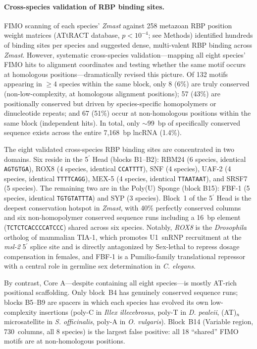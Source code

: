 \documentclass[12pt]{article}
\newcommand{\illex}{\textit{Illex illecebrosus}\xspace}
\begin{document}
\paragraph{Cross-species validation of RBP binding sites.}
FIMO scanning of each species' \textit{Zmast} against 258 metazoan RBP
position weight matrices (ATtRACT database, $p < 10^{-4}$; see Methods)
identified hundreds of binding sites per species
and suggested dense, multi-valent RBP binding across \textit{Zmast}.
However, systematic cross-species validation---mapping
all eight species' FIMO hits to alignment coordinates
and testing whether the same motif occurs at homologous positions---dramatically
revised this picture.
Of 132 motifs appearing in $\geq$4 species within the same block,
only 8 (6\%) are truly conserved
(non-low-complexity, at homologous alignment positions);
57 (43\%) are positionally conserved but driven
by species-specific homopolymers or dinucleotide repeats;
and 67 (51\%) occur at non-homologous positions
within the same block (independent hits).
In total, only $\sim$99~bp of specifically conserved sequence exists
across the entire 7,168~bp lncRNA (1.4\%).

The eight validated cross-species RBP binding sites
are concentrated in two domains.
Six reside in the 5$^\prime$ Head (blocks B1--B2):
RBM24 (6 species, identical \texttt{AGTGTGA}),
ROX8 (4 species, identical \texttt{CCATTTT}),
SNF (4 species), UAF-2 (4 species, identical \texttt{TTTTCAGG}),
MEX-5 (4 species, identical \texttt{TTAATAAT}),
and SRSF7 (5 species).
The remaining two are in the Poly(U) Sponge (block B15):
FBF-1 (5 species, identical \texttt{TGTGTATTTA})
and SYP (3 species).
Block~1 of the 5$^\prime$ Head is the deepest conservation hotspot in \textit{Zmast},
with 40\% perfectly conserved columns
and six non-homopolymer conserved sequence runs
including a 16~bp element (\texttt{TCTCTCACCCCATCCC})
shared across six species.
Notably, \textit{ROX8} is the \textit{Drosophila} ortholog of mammalian TIA-1,
which promotes U1~snRNP recruitment at the \textit{msl-2} 5$^\prime$ splice site
and is directly antagonized by Sex-lethal to repress dosage compensation in females,
and FBF-1 is a Pumilio-family translational repressor
with a central role in germline sex determination
in \textit{C. elegans}.

By contrast, Core A---despite containing all eight species---is
mostly AT-rich positional scaffolding.
Only block~B4 has genuinely conserved sequence runs;
blocks B5--B9 are spacers in which each species has evolved
its own low-complexity insertions
(poly-C in \illex, poly-T in \textit{D. pealeii},
(AT)$_n$ microsatellite in \textit{S. officinalis}, poly-A in \textit{O. vulgaris}).
Block~B14 (Variable region, 730~columns, all 8 species)
is the largest false positive:
all 18 ``shared'' FIMO motifs are at non-homologous positions.
\end{document}

